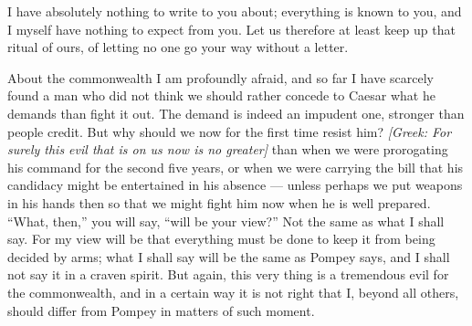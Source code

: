 

 I have absolutely nothing to write to you about; everything is known to you, and I myself have nothing to expect from you. Let us therefore at least keep up that ritual of ours, of letting no one go your way without a letter.

 About the commonwealth I am profoundly afraid, and so far I have scarcely found a man who did not think we should rather concede to Caesar what he demands than fight it out. The demand is indeed an impudent one, stronger than people credit. But why should we now for the first time resist him? \textit{[Greek: For surely this evil that is on us now is no greater]} than when we were prorogating his command for the second five years, or when we were carrying the bill that his candidacy might be entertained in his absence --- unless perhaps we put weapons in his hands then so that we might fight him now when he is well prepared. ``What, then,'' you will say, ``will be your view?'' Not the same as what I shall say. For my view will be that everything must be done to keep it from being decided by arms; what I shall say will be the same as Pompey says, and I shall not say it in a craven spirit. But again, this very thing is a tremendous evil for the commonwealth, and in a certain way it is not right that I, beyond all others, should differ from Pompey in matters of such moment.
